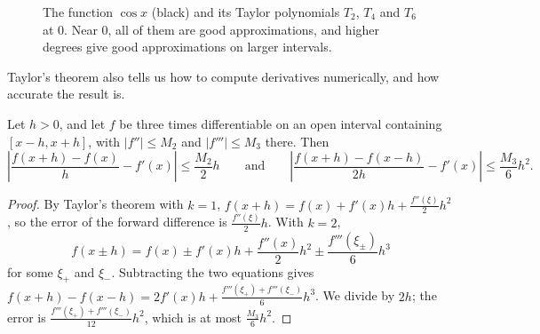 \begin{figure}[ht]
    \centering
    \caption{The function $\cos x$ (black) and its Taylor polynomials $T_2$, $T_4$ and $T_6$ at $0$. Near $0$, all of them are good approximations, and higher degrees give good approximations on larger intervals.}
    \label{L3-fig:taylor-cos}
\end{figure}

Taylor's theorem also tells us how to compute derivatives numerically, and how accurate the result is.

\begin{proposition}\label{L3-prop:finite-differences}
    Let $h > 0$, and let $f$ be three times differentiable on an open interval containing $[x - h, x + h]$, with $|f''| \leq M_2$ and $|f'''| \leq M_3$ there. Then
    \[\left| \frac{f(x + h) - f(x)}{h} - f'(x) \right| \leq \frac{M_2}{2} h \qquad \text{and} \qquad \left| \frac{f(x + h) - f(x - h)}{2h} - f'(x) \right| \leq \frac{M_3}{6} h^2.\]
\end{proposition}

\begin{proof}
    By Taylor's theorem with $k = 1$, $f(x + h) = f(x) + f'(x) h + \frac{f''(\xi)}{2} h^2$, so the error of the forward difference is $\frac{f''(\xi)}{2} h$. With $k = 2$,
    \[f(x \pm h) = f(x) \pm f'(x) h + \frac{f''(x)}{2} h^2 \pm \frac{f'''(\xi_\pm)}{6} h^3\]
    for some $\xi_+$ and $\xi_-$. Subtracting the two equations gives $f(x + h) - f(x - h) = 2 f'(x) h + \frac{f'''(\xi_+) + f'''(\xi_-)}{6} h^3$. We divide by $2h$; the error is $\frac{f'''(\xi_+) + f'''(\xi_-)}{12} h^2$, which is at most $\frac{M_3}{6} h^2$.
\end{proof}

